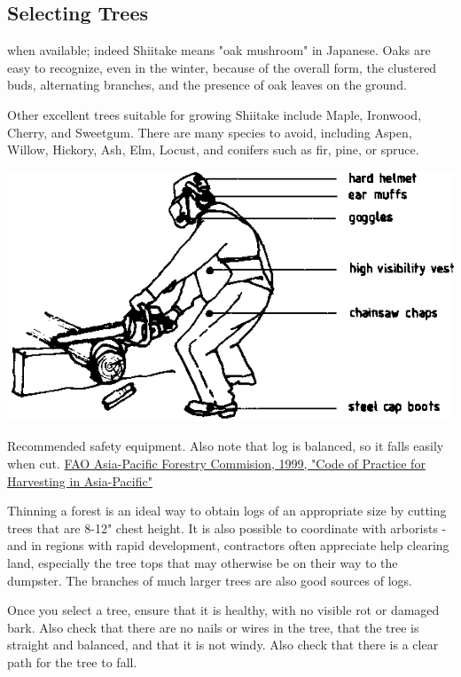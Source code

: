 \documentclass{tufte-handout}
\begin{document}
\subsection{Selecting Trees}


 when available; indeed Shiitake means "oak mushroom" in Japanese.   
Oaks are easy to recognize, even in the winter, because of the overall form, the clustered buds, alternating branches, and the presence of oak leaves on the ground.  

Other excellent trees suitable for growing Shiitake include Maple, Ironwood, Cherry, and Sweetgum.
There are many species to avoid, including Aspen, Willow, Hickory, Ash, Elm, Locust, and conifers such as fir, pine, or spruce.

\begin{marginfigure}
\includegraphics{chainsaw-safety}
\caption{Recommended safety equipment. Also note that log is balanced, so it falls easily when cut. \href{http://www.fao.org/docrep/004/ac142e/ac142e0g.htm}{FAO Asia-Pacific Forestry Commision, 1999, "Code of Practice for Harvesting in Asia-Pacific"}}
\end{marginfigure}

Thinning a forest is an ideal way to obtain logs of an appropriate size by cutting trees that are 8-12" chest height.
It is also possible to coordinate with arborists - and in regions with rapid development, contractors often appreciate help clearing land, especially the tree tops that may otherwise be on their way to the dumpster.
The branches of much larger trees are also good sources of logs.

Once you select a tree, ensure that it is healthy, with no visible rot or damaged bark.
Also check that there are no nails or wires in the tree, that the tree is straight and balanced, and that it is not windy. 
Also check that there is a clear path for the tree to fall.
\end{document}

